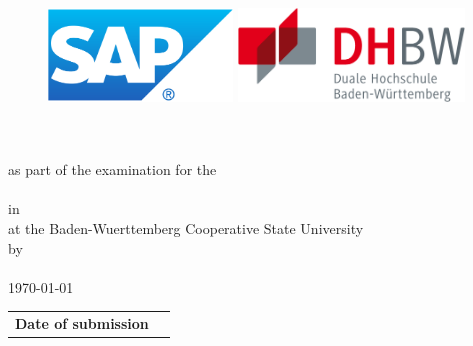 
\thispagestyle{empty}
{
	\begin{titlepage}
		\enlargethispage{4cm}
		\begin{figure}
			\begin{minipage}{0.49\textwidth}
				\flushleft
				\includegraphics[height=2.5cm]{images/logos/Logo_SAP.pdf} 
			\end{minipage}
			\hfill
			\begin{minipage}{0.49\textwidth}
				\flushright
				\includegraphics[height=2.5cm]{images/logos/dhbw.pdf} 
			\end{minipage}
		\end{figure} 
		\vspace*{0.1cm}
		\begin{center}
			\huge{\textbf{\titel}}\\[1.5cm]
			\Large{\textbf{\arbeit}}\\[0.5cm]
			\normalsize{as part of the examination for the\\[1ex] \textbf{\abschluss}}\\[0.5cm]
			\Large{in \studiengang}\\[1ex]
			\normalsize{at the Baden-Wuerttemberg Cooperative State University \dhbwStandort}\\[1cm]
			\normalsize{by}\\[1ex] \Large{\textbf{\vorname\,\nachname}} \\[1cm]
			\normalsize{{\printdayoff\today}}\\[2.25cm]
			\begin{spacing}{0.8}
				\begin{tabular}{ll}
					\textbf{Date of submission}				\hspace{4.5cm}					& \printdate{\abgabeDatum}\\[0.2cm]

\end{tabular}
\end{spacing}
\end{center}
\end{titlepage}}
